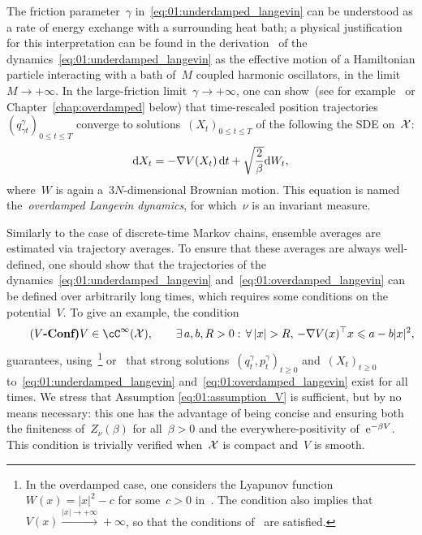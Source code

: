 The friction parameter~$\gamma$ in~\eqref{eq:01:underdamped_langevin} can be understood as a rate of energy exchange with a surrounding heat bath; a physical justification for this interpretation can be found in the derivation~\cite{FKM65} of the dynamics~\eqref{eq:01:underdamped_langevin} as the effective motion of a Hamiltonian particle interacting with a bath of~$M$ coupled harmonic oscillators, in the limit~$M\to+\infty$.
In the large-friction limit~$\gamma\to +\infty$, one can show~(see for example~\cite[Section 2.2.4]{LRS10} or Chapter~\ref{chap:overdamped} below) that time-rescaled position trajectories~$(q_{\gamma t}^\gamma)_{0\leq t\leq T}$ converge to solutions~$(X_t)_{0\leq t \leq T}$ of the following the SDE on~$\mathcal{X}$:
\begin{equation}
    \label{eq:01:overdamped_langevin}
    \mathrm{d} X_t = -\nabla V(X_t)\,\mathrm{d} t + \sqrt{\frac2\beta}\mathrm{d} W_t,
\end{equation}
where~$W$ is again a~$3N$-dimensional Brownian motion. This equation is named the~\textit{overdamped Langevin dynamics}, for which~$\nu$ is an invariant measure.

Similarly to the case of discrete-time Markov chains, ensemble averages are estimated via trajectory averages. To ensure that these averages are always well-defined, one should show that the trajectories of the dynamics~\eqref{eq:01:underdamped_langevin} and~\eqref{eq:01:overdamped_langevin} can be defined over arbitrarily long times, which requires some conditions on the potential~$V$.
To give an example, the condition
\begin{equation}
    \label{eq:01:assumption_V}
    \tag{\bf{$V$-Conf}}
    V\in\cC^\infty(\cX),\qquad\exists\,a,b,R>0:\,\forall\,|x|>R,\,-\nabla V(x)^\top x \leq a-b|x|^2,
\end{equation}
guarantees, using~\cite[Theorem 5.9]{RB06}\footnote{In the overdamped case, one considers the Lyapunov function~$W(x)=|x|^2-c$ for some~$c>0$ in~\cite[Theorem 5.9]{RB06}. The condition also implies that~$V(x)\xrightarrow{|x|\to+\infty}+\infty$, so that the conditions of~\cite[Example 5.10]{RB06} are satisfied.}
 or~\cite[Theorem 3.5]{K12} that strong solutions~$(q_t^\gamma,p_t^\gamma)_{t\geq 0}$ and~$(X_t)_{t\geq 0}$ to~\eqref{eq:01:underdamped_langevin} and~\eqref{eq:01:overdamped_langevin} exist for all times.
We stress that Assumption \eqref{eq:01:assumption_V} is sufficient, but by no means necessary: this one has the advantage of being concise and ensuring both the finiteness of~$Z_\nu(\beta)$ for all~$\beta>0$ and the everywhere-positivity of~$\mathrm{e}^{-\beta V}$. This condition is trivially verified when~$\mathcal{X}$ is compact and~$V$ is smooth.

